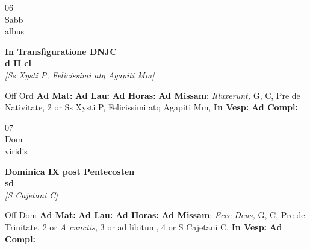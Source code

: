 \documentclass[10pt, openany]{book}
\begin{document}
        \begin{center}
            \begin{minipage}{3.5in}
                \vspace{2em}
                \begin{minipage}{0.5in}
                    {\Huge 06} \\
                    {\normalsize Sabb} \\
                    {\normalsize albus}
                \end{minipage}
                \begin{minipage}{3.0in}
                    \textbf{ \large In Transfiguratione DNJC \\
                    \textnormal{\normalsize d II cl}} \\ \textit{[Ss Xysti P, Felicissimi atq Agapiti Mm]} \\ 
                \end{minipage}
                \begin{justify}Off Ord
                    \textbf{Ad Mat: }
                    \textbf{Ad Lau: }
                    \textbf{Ad Horas: }\textbf{Ad Missam}: \textit{Illuxerunt,} G, C, Pre de Nativitate, 2 or Ss Xysti P, Felicissimi atq Agapiti Mm,  
                    \textbf{In Vesp: }
                    \textbf{Ad Compl: }
                \end{justify}
            \end{minipage}
        \end{center}
    
        \begin{center}
            \begin{minipage}{3.5in}
                \vspace{2em}
                \begin{minipage}{0.5in}
                    {\Huge 07} \\
                    {\normalsize Dom} \\
                    {\normalsize viridis}
                \end{minipage}
                \begin{minipage}{3.0in}
                    \textbf{ \large Dominica IX post Pentecosten \\
                    \textnormal{\normalsize sd}} \\ \textit{[S Cajetani C]} \\ 
                \end{minipage}
                \begin{justify}Off Dom
                    \textbf{Ad Mat: }
                    \textbf{Ad Lau: }
                    \textbf{Ad Horas: }\textbf{Ad Missam}: \textit{Ecce Deus,} G, C, Pre de Trinitate, 2 or \textit{A cunctis,} 3 or ad libitum, 4 or S Cajetani C,  
                    \textbf{In Vesp: }
                    \textbf{Ad Compl: }
                \end{justify}
            \end{minipage}
        \end{center}
    
\end{document}
